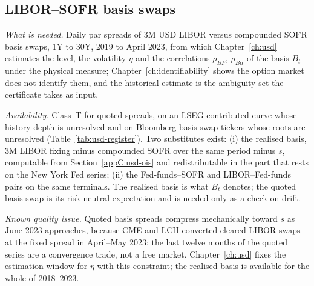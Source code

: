 
\subsection{LIBOR--SOFR basis swaps}\label{appC:usd-basis}

\emph{What is needed.} Daily par spreads of 3M USD LIBOR versus compounded SOFR basis swaps, 1Y to 30Y, 2019 to April 2023, from which Chapter~\ref{ch:usd} estimates the level, the volatility $\eta$ and the correlations $\rho_{BF}$, $\rho_{B\alpha}$ of the basis $B_t$ under the physical measure; Chapter~\ref{ch:identifiability} shows the option market does not identify them, and the historical estimate is the ambiguity set the certificate takes as input.

\emph{Availability.} Class~T for quoted spreads, on an LSEG contributed curve whose history depth is unresolved and on Bloomberg basis-swap tickers whose roots are unresolved (Table~\ref{tab:usd-register}). Two substitutes exist: (i) the realised basis, 3M LIBOR fixing minus compounded SOFR over the same period minus $s$, computable from Section~\ref{appC:usd-ois} and redistributable in the part that rests on the New York Fed series; (ii) the Fed-funds--SOFR and LIBOR--Fed-funds pairs on the same terminals. The realised basis is what $B_t$ denotes; the quoted basis swap is its risk-neutral expectation and is needed only as a check on drift.

\emph{Known quality issue.} Quoted basis spreads compress mechanically toward $s$ as June 2023 approaches, because CME and LCH converted cleared LIBOR swaps at the fixed spread in April--May 2023; the last twelve months of the quoted series are a convergence trade, not a free market. Chapter~\ref{ch:usd} fixes the estimation window for $\eta$ with this constraint; the realised basis is available for the whole of 2018--2023.

